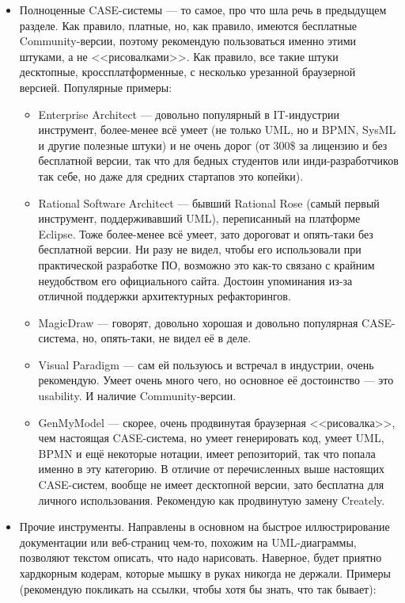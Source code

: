 \documentclass{../../text-style}
\begin{document}
\begin{itemize}
\begin{itemize}
    \end{itemize}
    \item Полноценные CASE-системы --- то самое, про что шла речь в предыдущем разделе. Как правило, платные, но, как правило, имеются бесплатные Community-версии, поэтому рекомендую пользоваться именно этими штуками, а не <<рисовалками>>. Как правило, все такие штуки десктопные, кроссплатформенные, с несколько урезанной браузерной версией. Популярные примеры:
    \begin{itemize}
        \item Enterprise Architect --- довольно популярный в IT-индустрии инструмент, более-менее всё умеет (не только UML, но и BPMN, SysML и другие полезные штуки) и не очень дорог (от 300\$ за лицензию и без бесплатной версии, так что для бедных студентов или инди-разработчиков так себе, но даже для средних стартапов это копейки).
        \item Rational Software Architect --- бывший Rational Rose (самый первый инструмент, поддерживавший UML), переписанный на платформе Eclipse. Тоже более-менее всё умеет, зато дороговат и опять-таки без бесплатной версии. Ни разу не видел, чтобы его использовали при практической разработке ПО, возможно это как-то связано с крайним неудобством его официального сайта. Достоин упоминания из-за отличной поддержки архитектурных рефакторингов.
        \item MagicDraw --- говорят, довольно хорошая и довольно популярная CASE-система, но, опять-таки, не видел её в деле.
        \item Visual Paradigm --- сам ей пользуюсь и встречал в индустрии, очень рекомендую. Умеет очень много чего, но основное её достоинство --- это usability. И наличие Community-версии.
        \item GenMyModel --- скорее, очень продвинутая браузерная <<рисовалка>>, чем настоящая CASE-система, но умеет генерировать код, умеет UML, BPMN и ещё некоторые нотации, имеет репозиторий, так что попала именно в эту категорию. В отличие от перечисленных выше настоящих CASE-систем, вообще не имеет десктопной версии, зато бесплатна для личного использования. Рекомендую как продвинутую замену Creately.
    \end{itemize}
    \item Прочие инструменты. Направлены в основном на быстрое иллюстрирование документации или веб-страниц чем-то, похожим на UML-диаграммы, позволяют текстом описать, что надо нарисовать. Наверное, будет приятно хардкорным кодерам, которые мышку в руках никогда не держали. Примеры (рекомендую покликать на ссылки, чтобы хотя бы знать, что так бывает):

\end{itemize}
\end{document}
